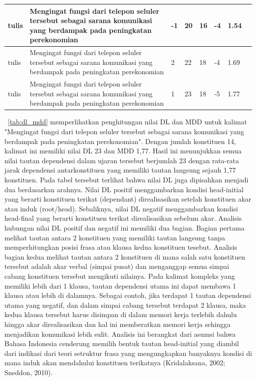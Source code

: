 \begin{center}
\begin{table}
\begin{tiny}
\begin{tabulary}{1\textwidth}{| L | L | L | L | L | L | L | L |}
tulis & Mengingat fungsi dari telepon seluler tersebut sebagai sarana komunikasi yang berdampak pada peningkatan perekonomian & -1 & 20 & 16 & -4 & 1.54 \\ \hline
tulis & Mengingat fungsi dari telepon seluler tersebut sebagai sarana komunikasi yang berdampak pada peningkatan perekonomian & 2 & 22 & 18 & -4 & 1.69 \\ \hline
tulis & Mengingat fungsi dari telepon seluler tersebut sebagai sarana komunikasi yang berdampak pada peningkatan perekonomian & 1 & 23 & 18 & -5 & 1.77 \\ \hline
  \end{tabulary}  
\end{tiny}
\end{table}
\end{center}

\tab~\ref{tab:dl_mdd} memperlihatkan penghitungan nilai DL dan MDD untuk kalimat "Mengingat fungsi dari telepon seluler tersebut sebagai sarana komunikasi yang berdampak pada peningkatan perekonomian". Dengan jumlah konstituen 14, kalimat ini memiliki nilai DL 23 dan MDD 1,77. Hasil ini menunjukkan semua nilai tautan dependensi dalam ujaran tersebut berjumlah 23 dengan rata-rata jarak dependensi antarkonstituen yang memiliki tautan langsung sejauh 1,77 konstituen. Pada tabel tersebut terlihat bahwa nilai DL juga dipisahkan menjadi dua berdasarkan arahnya. Nilai DL positif menggambarkan kondisi head-initial yang berarti konstituen terikat (dependant) direalisasikan setelah konstituen akar atau induk (root/head). Sebaliknya, nilai DL negatif menggambarkan kondisi head-final yang berarti konstituen terikat direalisasikan sebelum akar. Analisis hubungan nilai DL positif dan negatif ini memiliki dua bagian. Bagian pertama melihat tautan antara 2 konstituen yang memiliki tautan langsung tanpa memperhitungkan posisi frasa atau klausa kedua konstituen tesebut. Analisis bagian kedua melihat tautan antara 2 konstituen di mana salah satu konstituen tersebut adalah akar verbal (simpai pusat) dan menganggap semua simpai cabang konstituen tersebut mengikuti nilainya. Pada kalimat kompleks yang memiliki lebih dari 1 klausa, tautan dependensi utama ini dapat membawa 1 klausa atau lebih di dalamnya. Sebagai contoh, jika terdapat 1 tautan dependensi utama yang negatif, dan dalam simpai cabang tersebut terdapat 2 klausa, maka kedua klausa tersebut harus disimpan di dalam memori kerja terlebih dahulu hingga akar direalisasikan dan hal ini memberatkan memori kerja sehingga menjadikan komunikasi lebih sulit. Analisis ini berangkat dari asumsi bahwa Bahasa Indonesia cenderung memilih bentuk tautan head-initial yang diambil dari indikasi dari teori setruktur frasa yang mengungkapkan banyaknya kondisi di mana induk akan mendahului konstituen terikatnya (Kridalaksana, 2002; Sneddon, 2010).

